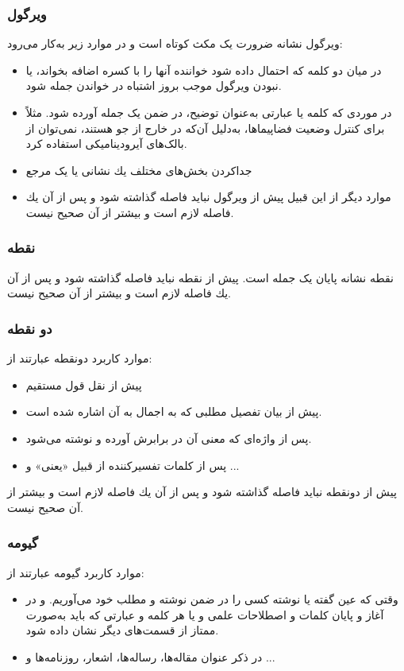 \subsubsection{ویرگول}
ویرگول نشانه ضرورت یک مكث كوتاه است و در موارد زیر به‌كار می‌رود:
\begin{itemize}
	\item 
	در میان دو كلمه كه احتمال داده شود خواننده آنها را با كسره اضافه بخواند، یا نبودن ویرگول موجب بروز اشتباه در خواندن جمله شود.
	\item
	در موردی كه كلمه یا عبارتی به‌‌‌‌عنوان توضیح، در ضمن یک جمله آورده شود. مثلاً برای کنترل وضعیت فضاپیماها، به‌دلیل آن‌که در خارج از جو هستند، نمی‌توان از بالک‌های آیرودینامیکی استفاده کرد.
	\item
	جدا‌كردن بخش‌های مختلف یك نشانی یا یک مرجع
	\item
موارد دیگر از این قبیل
	پیش از ویرگول نباید فاصله گذاشته شود و پس از آن یك فاصله لازم است و بیشتر از آن صحیح نیست.
\end{itemize}
\subsubsection{نقطه}
نقطه نشانه پایان یک جمله است. پیش از نقطه نباید فاصله گذاشته شود و پس از آن یك فاصله لازم است و بیشتر از آن صحیح نیست. 
\subsubsection{دو نقطه}
موارد كاربرد دونقطه عبارتند از:
\begin{itemize}
	\item 
	پیش از نقل قول مستقیم
	\item 
	پیش از بیان تفصیل مطلبی كه به اجمال به آن اشاره شده ‌است.
	\item 
	پس از واژه‌ای كه معنی آن در برابرش آورده و نوشته می‌شود.
	\item 
	پس از كلمات تفسیر‌كننده از قبیل «یعنی» و ...
\end{itemize}	
پیش از دونقطه نباید فاصله گذاشته شود و پس از آن یك فاصله لازم است و بیشتر از آن صحیح نیست.
\subsubsection{گیومه}
موارد كاربرد گیومه عبارتند از:
\begin{itemize}
	\item 
وقتی كه عین گفته یا نوشته كسی را در ضمن نوشته و مطلب خود می‌آوریم. 
	و در آغاز و پایان كلمات و اصطلاحات علمی و یا هر كلمه و عبارتی كه باید به‌صورت ممتاز از قسمت‌های دیگر نشان داده شود.
	\item
	در ذكر عنوان مقاله‌ها، رساله‌ها، اشعار، روزنامه‌ها و ...
\end{itemize}
